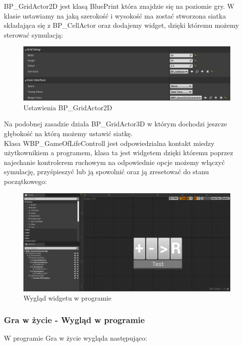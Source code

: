 \documentclass[a4paper,12pt,reqno]{article}
\begin{document}
BP\_GridActor2D jest klasą BluePrint która znajdzie się na poziomie gry. W klasie ustawiamy na jaką szerokość i wysokość ma zostać stworzona siatka składająca się z BP\_CellActor oraz dodajemy widget, dzięki któremu możemy sterować symulacją:

\begin{figure}[H]%
\centering
\includegraphics[width=0.7\columnwidth]{graphics/GridActor2DInUE_1.png}
\caption{Ustawienia BP\_GridActor2D 
\label{BPExample}}%
%
\qquad
\end{figure}  

Na podobnej zasadzie działa BP\_GridActor3D w którym dochodzi jeszcze głębokość na którą możemy ustawić siatkę.\\

Klasa WBP\_GameOfLifeControll jest odpowiedzialna kontakt miedzy użytkownikiem a programem, klasa ta jest widgetem dzięki któremu poprzez najechanie kontrolerem ruchowym na odpowiednie opcje możemy włączyć symulację, przyśpieszyć lub ją spowolnić oraz ją zresetować do stanu początkowego:

\begin{figure}[H]%
\centering
\includegraphics[width=0.7\columnwidth]{graphics/GameOfLifeControllInUE_1.png}
\caption{Wygląd widgetu w programie
\label{BPExample}}%
%
\qquad
\end{figure}  

\subsubsection{Gra w życie - Wygląd w programie}
W programie Gra w życie wygląda następująco:
\end{document}
